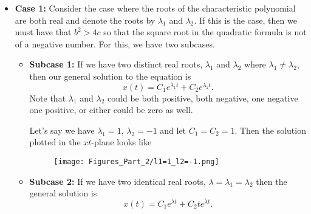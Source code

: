         \begin{itemize}
            \item \textbf{Case 1:} Consider the case where the roots of the characteristic polynomial are both real and denote the roots by $\lambda_1$ and $\lambda_2$.  If this is the case, then we must have that $b^2>4c$ so that the square root in the quadratic formula is not of a negative number. For this, we have two subcases.
            \begin{itemize}
                \item \textbf{Subcase 1:} If we have two distinct real roots, $\lambda_1$ and $\lambda_2$ where $\lambda_1\neq \lambda_2$, then our general solution to the equation is
                \[
                x(t)=C_1e^{\lambda_1 t}+C_2e^{\lambda_2 t}.
                \]
                Note that $\lambda_1$ and $\lambda_2$ could be both positive, both negative, one negative one positive, or either could be zero as well.

                Let's say we have $\lambda_1=1$, $\lambda_2=-1$ and let $C_1=C_2=1$. Then the solution plotted in the $xt$-plane looks like
                \begin{figure}[H]
                    \centering
                    \texttt{[image: Figures\_Part\_2/l1=1\_l2=-1.png]}
                \end{figure}
                \item \textbf{Subcase 2:} If we have two identical real roots, $\lambda=\lambda_1=\lambda_2$ then the general solution is
                \[
                x(t)=C_1 e^{\lambda t}+C_2te^{\lambda t}.
                \]


\end{itemize}
\end{itemize}
